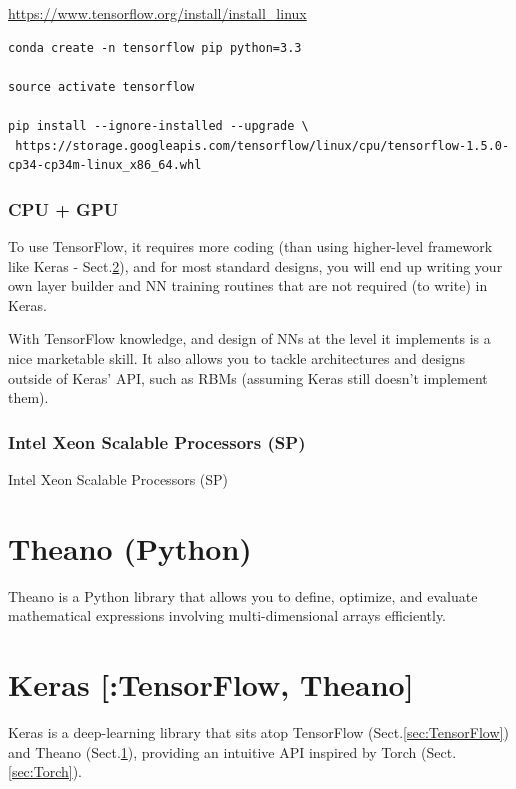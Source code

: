 \url{https://www.tensorflow.org/install/install_linux}
\begin{verbatim}
conda create -n tensorflow pip python=3.3

source activate tensorflow

pip install --ignore-installed --upgrade \
 https://storage.googleapis.com/tensorflow/linux/cpu/tensorflow-1.5.0-cp34-cp34m-linux_x86_64.whl
\end{verbatim}

\subsection{CPU + GPU}

To use TensorFlow, it requires more coding (than using higher-level framework
like Keras - Sect.\ref{sec:Keras}), and for most standard designs, you will end
up writing your own layer builder and NN training routines that are not required
(to write) in Keras.

With TensorFlow knowledge, and design of NNs at the level it implements is a
nice marketable skill. It also allows you to tackle architectures and designs
outside of Keras' API, such as RBMs (assuming Keras still doesn't implement
them).


\subsection{Intel  Xeon Scalable
Processors (SP) }
\label{sec:Intel-Xeon-Scalable-Processor}

Intel  Xeon Scalable
Processors (SP) 

\chapter{Theano (Python)}
\label{sec:Theano}

Theano is a Python library that allows you to define, optimize, and evaluate
mathematical expressions involving multi-dimensional arrays efficiently. 


\chapter{Keras [:TensorFlow, Theano]}
\label{sec:Keras}

Keras is a deep-learning library that sits atop TensorFlow
(Sect.\ref{sec:TensorFlow}) and Theano (Sect.\ref{sec:Theano}), providing an
intuitive API inspired by Torch (Sect.\ref{sec:Torch}).

